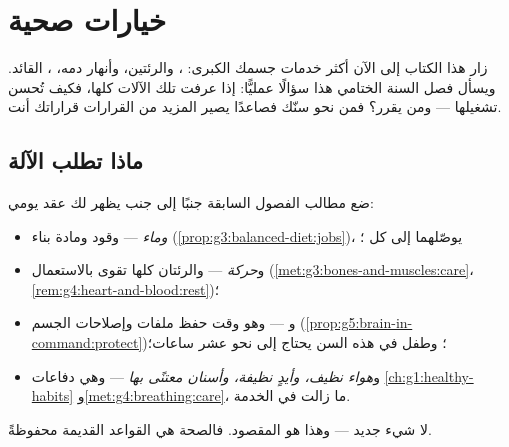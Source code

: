 \chapter{خيارات صحية}\label{ch:g5:healthy-choices}

زار هذا الكتاب إلى الآن أكثر خدمات جسمك الكبرى: ،
والرئتين،  وأنهار دمه،  ،  القائد.
ويسأل فصل السنة الختامي هذا سؤالًا عمليًّا: إذا عرفت تلك الآلات
كلها، فكيف تُحسن تشغيلها --- ومن يقرر؟ فمن نحو سنّك فصاعدًا يصير
المزيد من القرارات قراراتك أنت.

\section{ماذا تطلب الآلة}

\begin{proposition}\label{prop:g5:healthy-choices:contract}
ضع مطالب الفصول السابقة جنبًا إلى جنب يظهر لك عقد يومي:
\begin{itemize}
  \item \emph{ وماء} --- وقود ومادة بناء
        (\cref{prop:g3:balanced-diet:jobs})، يوصّلهما  إلى كل
        ؛
  \item و\emph{حركة} ---    والرئتان كلها
        تقوى بالاستعمال
        (\cref{met:g3:bones-and-muscles:care}،
        \cref{rem:g4:heart-and-blood:rest})؛
  \item و\emph{} --- وهو وقت حفظ ملفات  وإصلاحات الجسم
        (\cref{prop:g5:brain-in-command:protect})؛ وطفل في هذه
        السن يحتاج إلى نحو عشر ساعات؛
  \item و\emph{هواء نظيف، وأيدٍ نظيفة، وأسنان معتنًى بها} --- وهي
        دفاعات \cref{ch:g1:healthy-habits}
        و\cref{met:g4:breathing:care}، ما زالت في الخدمة.
\end{itemize}
لا شيء جديد --- وهذا هو المقصود. فالصحة هي القواعد القديمة
محفوظةً.
\end{proposition}
\admitted

